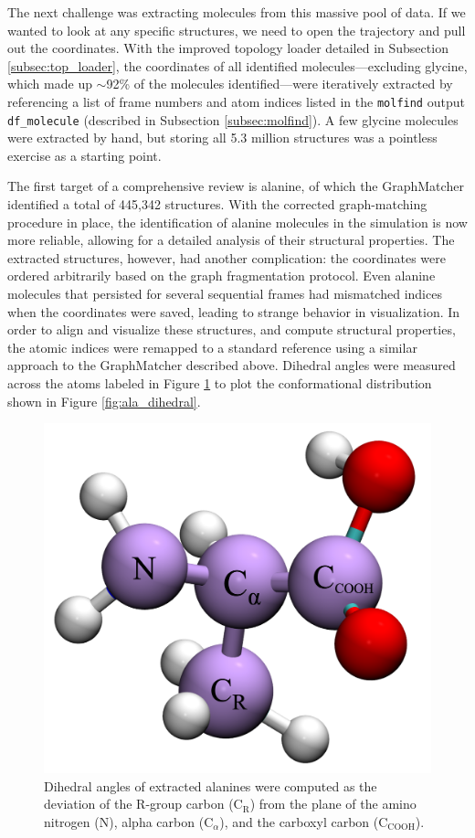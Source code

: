 The next challenge was extracting molecules from this massive pool of data.
If we wanted to look at any specific structures, we need to open the trajectory and pull out the coordinates.
With the improved topology loader detailed in Subsection \ref{subsec:top_loader}, the coordinates of all identified molecules---excluding glycine, which made up $\sim$92\% of the molecules identified---were iteratively extracted by referencing a list of frame numbers and atom indices listed in the \verb|molfind| output \verb|df_molecule| (described in Subsection \ref{subsec:molfind}).
A few glycine molecules were extracted by hand, but storing all 5.3 million structures was a pointless exercise as a starting point.

The first target of a comprehensive review is alanine, of which the GraphMatcher identified a total of 445,342 structures. 
With the corrected graph-matching procedure in place, the identification of alanine molecules in the simulation is now more reliable, allowing for a detailed analysis of their structural properties. 
The extracted structures, however, had another complication: the coordinates were ordered arbitrarily based on the graph fragmentation protocol.
Even alanine molecules that persisted for several sequential frames had mismatched indices when the coordinates were saved, leading to strange behavior in visualization.
In order to align and visualize these structures, and compute structural properties, the atomic indices were remapped to a standard reference using a similar approach to the GraphMatcher described above.
Dihedral angles were measured across the atoms labeled in Figure \ref{fig:alanine_dih_labeled} to plot the conformational distribution shown in Figure \ref{fig:ala_dihedral}.

\begin{figure}[!ht]
    \centering
    \includegraphics[width=0.5\linewidth]{Images/alanine_dihedral/dihedral_alanine.png}
    \caption[Atoms used in computing alanine dihedral angles]{Dihedral angles of extracted alanines were computed as the deviation of the R-group carbon ($\text{C}_\text{R}$) from the plane of the amino nitrogen (N), alpha carbon ($\text{C}_\alpha$), and the carboxyl carbon ($\text{C}_\text{COOH}$).}
    \label{fig:alanine_dih_labeled}
\end{figure}

